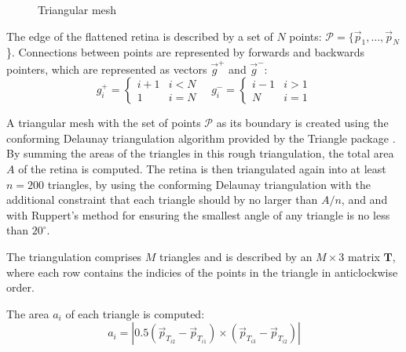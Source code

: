 \documentclass{article}
\begin{document}
\begin{figure}[tp]
  \centering
  \caption{Triangular mesh}
  \label{fold-sphere:fig:mesh}
\end{figure}

The edge of the flattened retina is described by a set of $N$ points:
$\mathcal{P} = \{\vec{p}_1,\dots,\vec{p}_N$\}. Connections between
points are represented by forwards and backwards pointers, which are
represented as vectors $\vec{g}^+$ and $\vec{g}^-$:
\begin{displaymath}
  g^+_i = \left\{
    \begin{array}{ll}
      i+1 & i < N \\
      1   & i = N
    \end{array}\right.
  \quad
  g^-_i = \left\{
    \begin{array}{ll}
      i-1 & i > 1 \\
      N   & i = 1
    \end{array}\right.
\end{displaymath}

A triangular mesh with the set of points $\mathcal{P}$ as its boundary
is created using the conforming Delaunay triangulation algorithm
provided by the Triangle package \citep{shewchuk96b}. By summing the
areas of the triangles in this rough triangulation, the total area $A$
of the retina is computed. The retina is then triangulated again into
at least $n=200$ triangles, by using the conforming Delaunay
triangulation with the additional constraint that each triangle should
by no larger than $A/n$, and and with Ruppert's
 method for ensuring the smallest angle of
any triangle is no less than $20^\circ$.

The triangulation comprises $M$ triangles and is described by an
$M\times3$ matrix $\mathbf{T}$, where each row contains the indicies
of the points in the triangle in anticlockwise order.

The area $a_i$ of each triangle is computed:
\begin{displaymath}
  a_i = |0.5 (\vec{p}_{T_{i2}}-\vec{p}_{T_{i1}})\times
  (\vec{p}_{T_{i3}}-\vec{p}_{T_{i2}})|
\end{displaymath}
\end{document}
